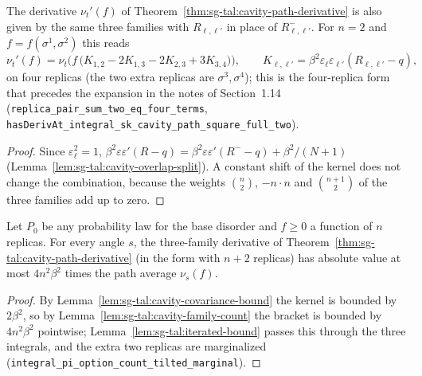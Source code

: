 \begin{theorem}
\label{thm:sg-tal:cavity-path-derivative-full}
  \leanok
{}
The derivative $\nu_t'(f)$ of Theorem~\ref{thm:sg-tal:cavity-path-derivative} is also given by the
same three families with $R_{\ell,\ell'}$ in place of $R^-_{\ell,\ell'}$.
For $n=2$ and $f=f(\sigma^1,\sigma^2)$ this reads
\[
\nu_t'(f)=\nu_t\Big(f\,\big(K_{1,2}-2K_{1,3}-2K_{2,3}+3K_{3,4}\big)\Big),\qquad
K_{\ell,\ell'}=\beta^2\varepsilon_\ell\varepsilon_{\ell'}(R_{\ell,\ell'}-q),
\]
on four replicas (the two extra replicas are $\sigma^3,\sigma^4$); this is the four-replica
form that precedes the expansion in the notes of Section~1.14 (\texttt{replica\_pair\_sum\_two\_eq\_four\_terms},
\texttt{hasDerivAt\_integral\_sk\_cavity\_path\_square\_full\_two}).
\end{theorem}
\begin{proof}
  \leanok
Since $\varepsilon_\ell^2=1$, $\beta^2\varepsilon\varepsilon'(R-q)=\beta^2\varepsilon\varepsilon'(R^--q)+\beta^2/(N+1)$
(Lemma~\ref{lem:sg-tal:cavity-overlap-split}). A constant shift of the kernel does not change the
combination, because the weights $\binom n2$, $-n\cdot n$ and $\binom{n+1}2$ of the three families add up
to zero.
\end{proof}

\begin{lemma}
\label{lem:sg-tal:cavity-derivative-domination}
  \leanok
{}
Let $P_0$ be any probability law for the base disorder and $f\ge0$ a function of $n$ replicas.
For every angle $s$, the three-family derivative of
Theorem~\ref{thm:sg-tal:cavity-path-derivative} (in the form with $n+2$ replicas) has absolute
value at most $4n^2\beta^2$ times the path average $\nu_s(f)$.
\end{lemma}
\begin{proof}
  \leanok
By Lemma~\ref{lem:sg-tal:cavity-covariance-bound} the kernel is bounded by $2\beta^2$, so by
Lemma~\ref{lem:sg-tal:cavity-family-count} the bracket is bounded by $4n^2\beta^2$ pointwise;
Lemma~\ref{lem:sg-tal:iterated-bound} passes this through the three integrals, and the extra two
replicas are marginalized (\texttt{integral\_pi\_option\_count\_tilted\_marginal}).
\end{proof}

